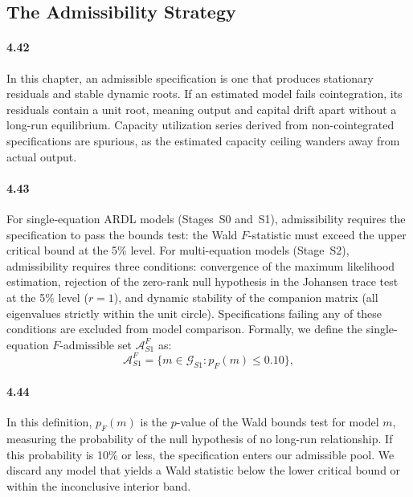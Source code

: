 \subsection{The Admissibility Strategy}
\label{subsec:admissibility_strategy}

\paragraph{4.42}
In this chapter, an admissible specification is one that produces stationary residuals and stable dynamic roots. If an estimated model fails cointegration, its residuals contain a unit root, meaning output and capital drift apart without a long-run equilibrium. Capacity utilization series derived from non-cointegrated specifications are spurious, as the estimated capacity ceiling wanders away from actual output.

\paragraph{4.43}
For single-equation ARDL models (Stages~S0 and~S1), admissibility requires the specification to pass the \citet{Pesaran2001} bounds test: the Wald $F$-statistic must exceed the upper critical bound at the 5\% level. For multi-equation models (Stage~S2), admissibility requires three conditions: convergence of the maximum likelihood estimation, rejection of the zero-rank null hypothesis in the Johansen trace test at the 5\% level ($r=1$), and dynamic stability of the companion matrix (all eigenvalues strictly within the unit circle). Specifications failing any of these conditions are excluded from model comparison. Formally, we define the single-equation $F$-admissible set $\mathcal{A}^{F}_{S1}$ as:
\begin{equation}
\mathcal{A}^{F}_{S1} = \{ m \in \mathcal{G}_{S1} : p_F(m) \leq 0.10 \},
\label{eq:A_F_S1}
\end{equation}

\paragraph{4.44}
In this definition, $p_F(m)$ is the $p$-value of the Wald bounds test for model $m$, measuring the probability of the null hypothesis of no long-run relationship. If this probability is 10\% or less, the specification enters our admissible pool. We discard any model that yields a Wald statistic below the lower critical bound or within the inconclusive interior band.

